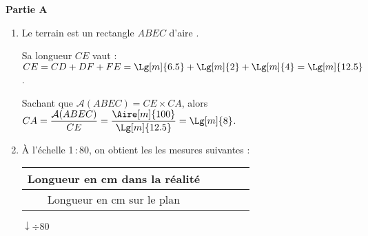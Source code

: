 {\bf Partie A}
\begin{enumerate}
   \item Le terrain est un rectangle $ABEC$ d'aire . \par
      Sa longueur $CE$ vaut : $CE =CD+DF+FE =\Lg[m]{6.5}+\Lg[m]{2}+\Lg[m]{4} =\Lg[m]{12.5}$. \par
      Sachant que $\mathcal{A}(ABEC) =CE\times CA$, alors $CA =\dfrac{\mathcal{A}(ABEC)}{CE} =\dfrac{\Aire[m]{100}}{\Lg[m]{12.5}} =\Lg[m]{8}$. \par
   \item À l'échelle 1\,:\,80, on obtient les les mesures suivantes :
      \begin{center}
         \begin{tabular}{|c|C{2}|C{2}|C{2}|C{2}|}
            \hline
            Longueur en cm dans la réalité &  &  &  &  \\
            \hline
            Longueur en cm sur le plan &  &  &  & \\
            \hline
         \end{tabular} $\downarrow \div 80$


\end{center}
\end{enumerate}
